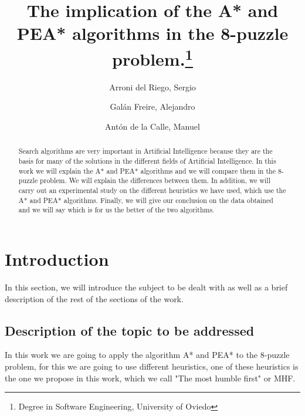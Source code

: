 \documentclass[runningheads]{llncs}
\begin{document}
%
\title{The implication of the A* and PEA* algorithms in the 8-puzzle problem.\thanks{Degree in Software Engineering, University of Oviedo}}
%
%
\author{Arroni del Riego, Sergio \and
Galán Freire, Alejandro \and
Antón de la Calle, Manuel }
%
%
%
\maketitle             %
%
\begin{abstract}
    Search algorithms are very important in Artificial Intelligence because they are the basis for many of the solutions in the different fields of Artificial Intelligence. In this work we will explain the A* and PEA* algorithms and we will compare them in the 8-puzzle problem. We will explain the differences between them.
    In addition, we will carry out an experimental study on the different heuristics we have used, which use the A* and PEA* algorithms. Finally, we will give our conclusion on the data obtained and we will say which is for us the better of the two algorithms. 

\end{abstract}
%
%
%
\section{Introduction}
In this section, we will introduce the subject to be dealt with as well 
as a brief description of the rest of the sections of the work.

\subsection{Description of the topic to be addressed}
In this work we are going to apply the algorithm A* and PEA* to the 8-puzzle problem, 
for this we are going to use different heuristics, 
one of these heuristics is the one we propose in this work, 
which we call "The most humble first" or MHF. 
\end{document}
